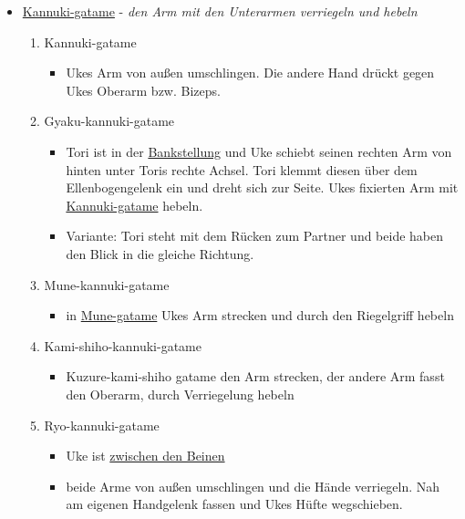 \documentclass[justified, a4paper, notitlepage, captions=tableheading, nobib]{tufte-handout}
\begin{document}
\begin{itemize}
\item \hyperref[org0b24320]{Kannuki-gatame} - \emph{den Arm mit den Unterarmen verriegeln und hebeln}

\begin{enumerate}
\item \label{org0b24320}Kannuki-gatame 
\begin{itemize}
\item Ukes Arm von außen umschlingen. Die andere Hand drückt gegen Ukes Oberarm bzw. Bizeps.
\end{itemize}
\item \label{org456c4d0}Gyaku-kannuki-gatame 
\begin{itemize}
\item Tori ist in der \hyperref[orgd4877a8]{Bankstellung} und Uke schiebt seinen rechten Arm von hinten unter Toris rechte Achsel. Tori klemmt diesen über dem Ellenbogengelenk ein und dreht sich zur Seite. Ukes fixierten Arm mit \hyperref[org0b24320]{Kannuki-gatame} hebeln.
\item Variante: Tori steht mit dem Rücken zum Partner und beide haben den Blick in die gleiche Richtung.
\end{itemize}
\item \label{org96a09f2}Mune-kannuki-gatame 
\begin{itemize}
\item in \hyperref[org97af0c8]{Mune-gatame} Ukes Arm strecken und durch den Riegelgriff hebeln
\end{itemize}
\item \label{orgec6d121}Kami-shiho-kannuki-gatame 
\begin{itemize}
\item Kuzure-kami-shiho gatame den Arm strecken, der andere Arm fasst den Oberarm, durch Verriegelung hebeln
\end{itemize}
\item \label{orgc03da31}Ryo-kannuki-gatame
\begin{itemize}
\item Uke ist \hyperref[org9bede9d]{zwischen den Beinen}
\item beide Arme von außen umschlingen und die Hände verriegeln. Nah am eigenen Handgelenk fassen und Ukes Hüfte wegschieben.
\end{itemize}
\end{enumerate}
\end{itemize}
\end{document}

